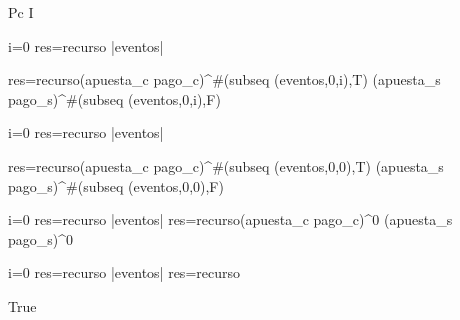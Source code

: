 \begin{itemize}
    { \item Pc \longrightarrow I}
\end{itemize}

\equiv i=0 \wedge res=recurso  \leq |eventos|\yLuego

res=recurso(apuesta_c pago_c)^{\#(subseq (eventos,0,i),T)} (apuesta_s pago_s)^{\#(subseq (eventos,0,i),F)} 
\vspace{0.3cm}

\equiv i=0 \wedge res=recurso  \leq |eventos| \yLuego 

res=recurso(apuesta_c pago_c)^{\#(subseq (eventos,0,0),T)} (apuesta_s pago_s)^{\#(subseq (eventos,0,0),F)}
\vspace{0.3cm}

\equiv i=0 \wedge res=recurso  \leq |eventos| \yLuego res=recurso(apuesta_c pago_c)^{0} (apuesta_s pago_s)^{0}
\vspace{0.3cm}

\equiv  i=0 \wedge res=recurso  \leq |eventos| \yLuego res=recurso 
\vspace{0.3cm}


\equiv True